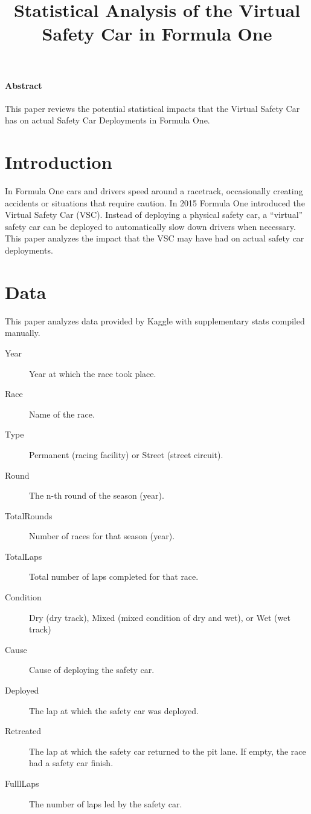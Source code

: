 \documentclass[11pt]{article}
\title{Statistical Analysis of the Virtual Safety Car in Formula One}
\date{}
\begin{document}
\maketitle
\paragraph*{Abstract}
This paper reviews the potential statistical impacts that the Virtual Safety Car has on actual Safety Car Deployments in Formula One.

\pagebreak

\section{Introduction}
In Formula One cars and drivers speed around a racetrack, occasionally creating accidents or situations that require caution. In 2015 Formula One introduced the Virtual Safety Car (VSC). Instead of deploying a physical safety car, a ``virtual'' safety car can be deployed to automatically slow down drivers when necessary. This paper analyzes the impact that the VSC may have had on actual safety car deployments.

\section{Data}
This paper analyzes data provided by Kaggle with supplementary stats compiled manually.
\begin{description}
    \item[Year] Year at which the race took place.
    \item[Race] Name of the race.
    \item[Type] Permanent (racing facility) or Street (street circuit).
    \item[Round] The n-th round of the season (year).
    \item[TotalRounds] Number of races for that season (year).
    \item[TotalLaps] Total number of laps completed for that race.
    \item[Condition] Dry (dry track), Mixed (mixed condition of dry and wet), or Wet (wet track)
    \item[Cause] Cause of deploying the safety car.
    \item[Deployed] The lap at which the safety car was deployed.
    \item[Retreated] The lap at which the safety car returned to the pit lane. If empty, the race had a safety car finish.
    \item[FulllLaps] The number of laps led by the safety car.
\end{description}
\end{document}
